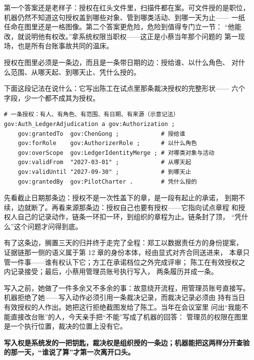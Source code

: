 第一个答案还是老样子：授权在红头文件里，扫描件都在案。可文件授的是职位，
机器仍然不知道这句授权盖到哪些对象、管到哪类活动、到哪一天为止——
一纸任命在图里还是一格图像。第二个答案更危险，危险到值得专门立一节：
“他能改，就说明他有权改。”拿系统权限当职权——这正是小蔡当年那个问题的
第一现场，也是所有台账事故共同的温床。

授权在图里必须是一条边，而且是一条带日期的边：授给谁、以什么角色、
对什么范围、从哪天起、到哪天止、凭什么授的。

下面这段记法在说什么：它写出陈工在试点里那条裁决授权的完整形状——
六个字段，少一个都不成其为授权。

\nopagebreak[4]
\begin{codebox}
\begin{Verbatim}[fontsize=\small,breaklines=true,breakanywhere=true,breaksymbolleft={},breaksymbolright={}]
# 一条授权：有人、有角色、有范围、有日期、有来源（示意记法）
gov:Auth_LedgerAdjudication a gov:Authorization ;
    gov:grantedTo  gov:ChenGong ;            # 授给谁
    gov:forRole    gov:AuthorizerRole ;      # 以什么角色
    gov:overScope  gov:LedgerIdentityMerge ; # 对哪类对象与活动
    gov:validFrom  "2027-03-01" ;            # 从哪天起
    gov:validUntil "2027-09-30" ;            # 到哪天止
    gov:grantedBy  gov:PilotCharter .        # 凭什么授的
\end{Verbatim}
\end{codebox}

先看截止日期那条边：授权不是一次性盖下的章，是一段有起止的承诺，
到期不续，边就断了。再看来源那条边：授权自己也要有授权——它指向试点章程
和授权人自己的记录动作，链条一环扣一环，到组织的章程为止。链条封了顶，
“凭什么”这个问题才问得到底。

有了这条边，搁置三天的归并终于走完了全程：郑工以数据责任方的身份提案，
证据链那一侧的语义属于第 12 章的身份本体，经由显式对齐合同送进来，
本章只管一件事——谁有权认下它；方工在承诺档位之外完成评审；
陈工在有效授权之内记录接受；最后，小蔡用管理员账号执行写入，
两条履历并成一条。

写入之前，她做了一件多余又不多余的事：故意绕开流程，用管理员账号直接写。
机器拒绝了她——写入动作必须引用一条裁决记录，而裁决记录必须由
持有当日有效授权的人作出。她把这行拒绝截图发给了陈工。当年在会议室里
问出“我能不能直接改台账”的人，今天亲手把“不能”写成了机器的回答：
管理员的权限在图里是一个执行位置，裁决的位置上没有它。

\textbf{写入权是系统发的一把钥匙，裁决权是组织授的一条边；机器能把这两样分开查验的那一天，“谁说了算”才第一次离开口头。}

